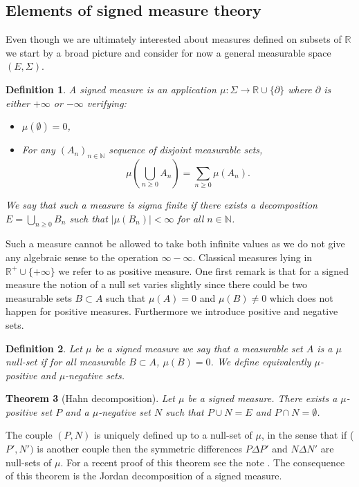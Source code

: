 \documentclass[11pt,a4paper]{article}
\newcommand{\RR}{\mathbb{R}}
\newcommand{\NN}{\mathbb{N}}
\newcommand{\Seq}[1]{\left(#1\right)_{n\in \mathbb{N}}}
\newtheorem{theorem}{Theorem}[section]
\newtheorem{definition}[theorem]{Definition}
\begin{document}
\subsection{Elements of signed measure theory}
Even though we are ultimately interested about measures defined on subsets of $\RR$ we start by a broad picture and consider for now a general measurable space $(E,\Sigma)$.
\begin{definition}
    A signed measure is an application $\mu : \Sigma \to \RR \cup\lbrace \partial \rbrace$ where $\partial $ is either $+\infty$ or $-\infty$ verifying:
    \begin{itemize}
        \item $\mu(\emptyset) = 0$,
        \item For any $\Seq{A_n}$ sequence of disjoint measurable sets,
        \[\mu \left( \bigcup\limits_{n \geq 0} A_n\right) = \sum\limits_{n \geq 0} \mu(A_n).\]
    \end{itemize}
    We say that such a measure is sigma finite if there exists a decomposition $E = \bigcup\limits_{n \geq 0} B_n$ such that $|\mu(B_n)| < \infty$ for all $n \in \NN$.
\end{definition}
Such a measure cannot be allowed to take both infinite values as we do not give any algebraic sense to the operation $\infty - \infty$. Classical measures lying in $\RR^+\cup\lbrace +\infty\rbrace$ we refer to as positive measure. One first remark is that for a signed measure the notion of a null set varies slightly since there could be two measurable sets $B\subset A$ such that $\mu(A) = 0$ and $\mu(B) \neq 0$ which does not happen for positive measures. Furthermore we introduce positive and negative sets.
\begin{definition}
    Let $\mu$ be a signed measure we say that a measurable set $A$ is a $\mu$ null-set if for all measurable $B \subset A$, $\mu(B) = 0$. We define equivalently $\mu$-positive and $\mu$-negative sets.
\end{definition}
\begin{theorem}[Hahn decomposition]
    Let $\mu$ be a signed measure. There exists a $\mu$-positive set $P$ and a $\mu$-negative set $N$ such that $P\cup N = E$ and $P\cap N = \emptyset$. 
\end{theorem}
The couple $(P,N)$ is uniquely defined up to a null-set of $\mu$, in the sense that if ($P',N')$ is another couple then the symmetric differences $P\Delta P'$ and $N\Delta N'$ are null-sets of $\mu$. For a recent proof of this theorem see the note \cite{fischer2012existence}. The consequence of this theorem is the Jordan decomposition of a signed measure.
\end{document}

